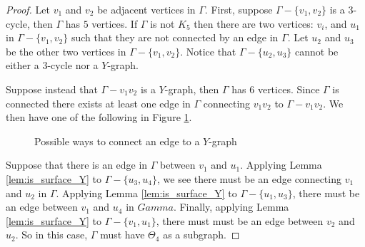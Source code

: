 \begin{proof}
    Let \(v_1\) and \(v_2\) be adjacent vertices in \(\Gamma\).
    First, suppose \(\Gamma - \{v_1, v_2\}\) is a \(3\)-cycle, then \(\Gamma\) has \(5\) vertices.
    If \(\Gamma\) is not \(K_5\) then there are two vertices: \(v_i\), and \(u_1\) in \(\Gamma - \{v_1, v_2\}\)
    such that they are not connected by an edge in \(\Gamma\).
    Let \(u_2\) and \(u_3\) be the other two vertices in \(\Gamma - \{v_1, v_2\}\).
    Notice that \(\Gamma - \{u_2, u_3\}\) cannot be either a \(3\)-cycle nor a \(Y\)-graph.

    Suppose instead that \(\Gamma - v_1 v_2\) is a \(Y\)-graph, then \(\Gamma\) has \(6\) vertices.
    Since \(\Gamma\) is connected there exists at least one edge in \(\Gamma\) connecting \(v_1 v_2\) to \(\Gamma - v_1 v_2\).
    We then have one of the following in Figure \ref{fig:edgeygraphconnections}.
    \begin{figure}[h!]
        \centering
        \quad
        \caption{Possible ways to connect an edge to a \(Y\)-graph}
        \label{fig:edgeygraphconnections}
    \end{figure}

    Suppose that there is an edge in \(\Gamma\) between \(v_1\) and \(u_1\).
    Applying Lemma \ref{lem:is_surface_Y} to \(\Gamma - \{u_3, u_4\}\), we see there must be an edge
    connecting \(v_1\) and \(u_2\) in \(\Gamma\).
    Applying Lemma \ref{lem:is_surface_Y} to \(\Gamma - \{u_1, u_3\}\), there must be an edge between
    \(v_1\) and \(u_4\) in \(Gamma\).
    Finally, applying Lemma \ref{lem:is_surface_Y} to \(\Gamma - \{v_1, u_1\}\), there must must be
    an edge between \(v_2\) and \(u_2\).
    So in this case, \(\Gamma\) must have \(\Theta_4\) as a subgraph.


\end{proof}
